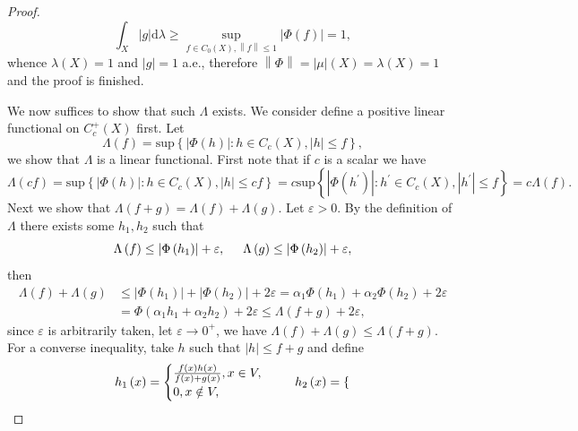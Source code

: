 \begin{proof}
$$\int_X{\left| g \right|\mathrm{d}\lambda}\ge \mathop {\mathrm{sup}} \limits_{f\in C_0\left( X \right) ,\left\| f \right\| \le 1}\left| \Phi \left( f \right) \right|=1,
$$
whence $\lambda(X)=1$ and $|g|=1$ a.e., therefore $\left\| \Phi \right\| =\left| \mu \right|\left( X \right) =\lambda \left( X \right) =1$ and the proof is finished.\par
We now suffices to show that such $\Lambda$ exists. We consider define a positive linear functional on $C_c^+(X)$ first. Let 
$$
\Lambda \left( f \right) =\mathrm{sup}\left\{ \left| \Phi \left( h \right) \right|:h\in C_c\left( X \right) ,\left| h \right|\le f \right\} ,
$$
we show that $\Lambda$ is a linear functional. First note that if $c$ is a scalar we have 
$$
\Lambda \left( cf \right) =\mathrm{sup}\left\{ \left| \Phi \left( h \right) \right|:h\in C_c\left( X \right) ,\left| h \right|\le cf \right\} =c\mathrm{sup}\left\{ \left| \Phi \left( h^{\prime} \right) \right|:h^{\prime}\in C_c\left( X \right) ,\left| h^{\prime} \right|\le f \right\} =c\Lambda \left( f \right) .
$$
Next we show that $\Lambda(f+g)=\Lambda(f)+\Lambda(g)$. Let $\varepsilon>0$. By the definition of $\Lambda$ there exists some $h_1,h_2$ such that 
$$
\Lambda \left( f \right) \le \left| \Phi \left( h_1 \right) \right|+\varepsilon ,\hspace{0.5cm}\Lambda \left( g \right) \le \left| \Phi \left( h_2 \right) \right|+\varepsilon ,
$$
then 
$$
\begin{aligned}
\Lambda \left( f \right) +\Lambda \left( g \right) &\le \left| \Phi \left( h_1 \right) \right|+\left| \Phi \left( h_2 \right) \right|+2\varepsilon =\alpha _1\Phi \left( h_1 \right) +\alpha _2\Phi \left( h_2 \right) +2\varepsilon 
\\
&=\Phi \left( \alpha _1h_1+\alpha _2h_2 \right) +2\varepsilon \le \Lambda \left( f+g \right) +2\varepsilon ,
\end{aligned}
$$
since $\varepsilon$ is arbitrarily taken, let $\varepsilon\to 0^+$, we have $\Lambda \left( f \right) +\Lambda \left( g \right) \le \Lambda \left( f+g \right) $. For a converse inequality, take $h$ such that $|h|\le f+g$ and define 
$$
h_1\left( x \right) =\begin{cases}
	\frac{f\left( x \right) h\left( x \right)}{f\left( x \right) +g\left( x \right)},x\in V,\\
	0,x\notin V,\\
\end{cases}\hspace{0.5cm}h_2\left( x \right) =\begin{cases}

\end{cases}$$
\end{proof}
